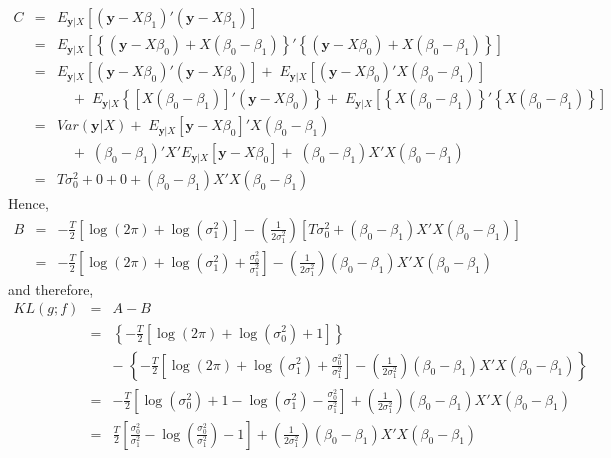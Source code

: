 \begin{eqnarray*}
C &=& E_{\mathbf{y}|X}\left[\left(\textbf{y} - X\beta_1\right)'\left(\textbf{y} -X\beta_1\right)\right]\\
&=&E_{\mathbf{y}|X}\left[\left\{ \left(\mathbf{y} - X\beta_0\right) + X\left(\beta_0 - \beta_1\right)\right\}'\left\{ \left(\mathbf{y} - X\beta_0\right)+ X\left(\beta_0 - \beta_1\right)\right\} \right]\\
&=& E_{\mathbf{y}|X}\left[\left(\mathbf{y} - X\beta_0\right)'\left(\mathbf{y} - X\beta_0\right)\right] +\; E_{\mathbf{y}|X}\left[\left(\mathbf{y} -X\beta_0\right)'X\left(\beta_0 - \beta_1\right)\right] \\
&& \quad +\; E_{\mathbf{y}|X}\left\{\left[X\left(\beta_0 -\beta_1 \right) \right]'\left(\mathbf{y} - X\beta_0 \right)\right\} + \;E_{\mathbf{y}|X}\left[\left\{X\left(\beta_0 - \beta_1\right)\right\}'\left\{X\left(\beta_0 - \beta_1\right)\right\} \right]\\
&=& Var(\mathbf{y}|X) + \; E_{\mathbf{y}|X}\left[\mathbf{y} - X\beta_0 \right]'X(\beta_0 -\beta_1) \\
&& \quad + \;(\beta_0 -\beta_1)'X'E_{\mathbf{y}|X}\left[\mathbf{y} - X\beta_0 \right] + \; (\beta_0 - \beta_1)X'X(\beta_0 - \beta_1)\\
&=& T\sigma_0^2 + 0 + 0 + (\beta_0 - \beta_1)X'X(\beta_0 - \beta_1)
\end{eqnarray*}
Hence,
\begin{eqnarray*}
B &=& -\frac{T}{2}\left[\log(2\pi) + \log(\sigma^2_1) \right] - \left(\frac{1}{2\sigma_1^2}\right) \left[ T\sigma_0^2 + (\beta_0 - \beta_1)X'X(\beta_0 - \beta_1)\right]\\
&=& -\frac{T}{2}\left[\log(2\pi) + \log(\sigma^2_1) + \frac{\sigma_0^2}{\sigma_1^2}\right] - \left(\frac{1}{2\sigma_1^2} \right)(\beta_0 - \beta_1)X'X(\beta_0 - \beta_1)
\end{eqnarray*}
and therefore,
\begin{eqnarray*}
KL(g;f) &=& A - B\\
&=& \left\{ -\frac{T}{2}\left[ \log(2\pi) + \log(\sigma^2_0) + 1 \right]\right\}\\
&& - \; \left\{ -\frac{T}{2}\left[\log(2\pi) + \log(\sigma^2_1) + \frac{\sigma_0^2}{\sigma_1^2}\right] - \left(\frac{1}{2\sigma_1^2} \right)(\beta_0 - \beta_1)X'X(\beta_0 - \beta_1) \right\}\\
&=& -\frac{T}{2} \left[ \log(\sigma_0^2) + 1 - \log(\sigma_1^2) - \frac{\sigma_0^2}{\sigma_1^2}\right] + \left(\frac{1}{2\sigma_1^2} \right)(\beta_0 - \beta_1)X'X(\beta_0 - \beta_1)\\
&=& \frac{T}{2}\left[\frac{\sigma_0^2}{\sigma_1^2} - \log\left(\frac{\sigma_0^2}{\sigma_1^2} \right) - 1\right] + \left(\frac{1}{2\sigma_1^2} \right)(\beta_0 - \beta_1)X'X(\beta_0 - \beta_1)
\end{eqnarray*}
